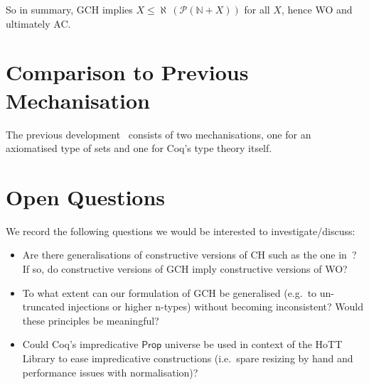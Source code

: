 \documentclass{easychair}
\newcommand{\nat}{\mathbb{N}}
\newcommand{\pow}{\mathcal{P}}
\begin{document}
So in summary, GCH implies $X\le \aleph\,(\pow(\nat + X))$ for all $X$, hence WO and ultimately AC.


\section{Comparison to Previous Mechanisation}

The previous development~\cite{kirst2021generalised} consists of two mechanisations, one for an axiomatised type of sets and one for Coq's type theory itself.



\section{Open Questions}

We record the following questions we would be interested to investigate/discuss:
\begin{itemize}[noitemsep]
	\item
	Are there generalisations of constructive versions of CH such as the one in~\cite{gielen1981continuum}?
	If so, do constructive versions of GCH imply constructive versions of WO?
	\item
	To what extent can our formulation of GCH be generalised (e.g.\ to un-truncated injections or higher n-types) without becoming inconsistent? Would these principles be meaningful?
	\item
	Could Coq's impredicative $\mathsf{Prop}$ universe be used in context of the HoTT Library to ease impredicative constructions (i.e.\ spare resizing by hand and performance issues with normalisation)?
\end{itemize}



\scriptsize{}
\vspace{-20em}
\end{document}
